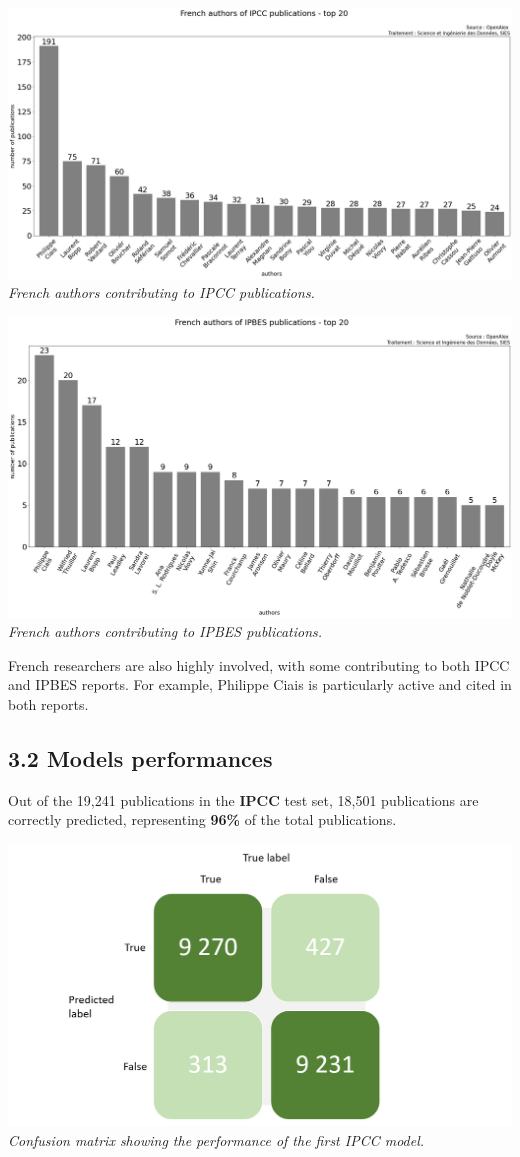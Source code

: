 \documentclass[
]{article}
\begin{document}
\includegraphics{./images/teds_ipcc_authors.png} \emph{French authors
contributing to IPCC publications.}

\includegraphics{./images/teds_ipbes_authors.png} \emph{French authors
contributing to IPBES publications.}

French researchers are also highly involved, with some contributing to
both IPCC and IPBES reports. For example, Philippe Ciais is particularly
active and cited in both reports.

\hypertarget{models-performances}{%
\subsection{3.2 Models performances}\label{models-performances}}

Out of the 19,241 publications in the \textbf{IPCC} test set, 18,501
publications are correctly predicted, representing \textbf{96\%} of the
total publications.

\includegraphics{./images/teds_ipcc_model.png} \emph{Confusion matrix
showing the performance of the first IPCC model.}
\end{document}
